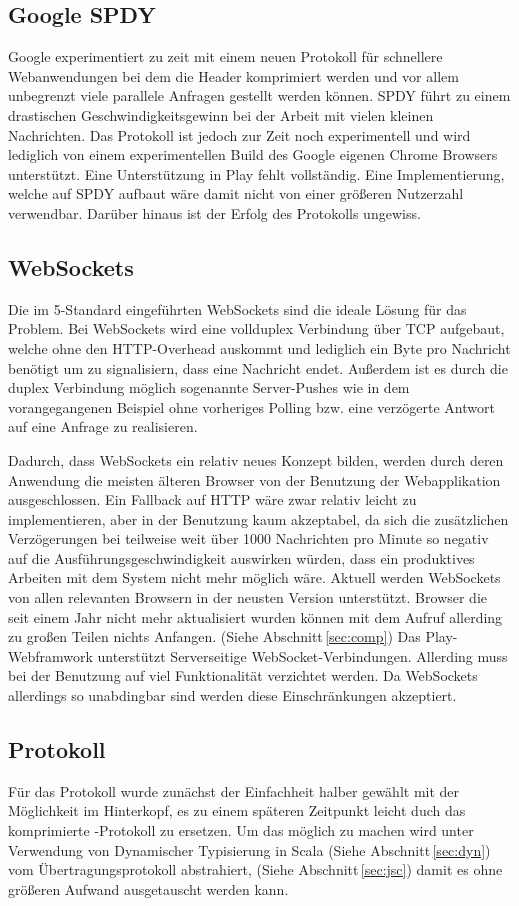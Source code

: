 \subsection{Google SPDY}

Google experimentiert zu zeit mit einem neuen Protokoll für schnellere Webanwendungen bei dem die
Header komprimiert werden und vor allem unbegrenzt viele parallele Anfragen gestellt werden können.
SPDY führt zu einem drastischen Geschwindigkeitsgewinn bei der Arbeit mit vielen kleinen
Nachrichten. Das Protokoll ist jedoch zur Zeit noch experimentell und wird lediglich von einem
experimentellen Build des Google eigenen Chrome Browsers unterstützt. Eine Unterstützung in Play
fehlt vollständig. Eine Implementierung, welche auf SPDY aufbaut wäre damit nicht von einer größeren
Nutzerzahl verwendbar. Darüber hinaus ist der Erfolg des Protokolls ungewiss.

\subsection{WebSockets}
\label{sec:ws}

Die im 5-Standard eingeführten WebSockets sind die ideale Lösung für das Problem. Bei
WebSockets wird eine vollduplex Verbindung über TCP aufgebaut, welche ohne den HTTP-Overhead
auskommt und lediglich ein Byte pro Nachricht benötigt um zu signalisiern, dass eine Nachricht
endet. Außerdem ist es durch die duplex Verbindung möglich sogenannte Server-Pushes wie in dem
vorangegangenen Beispiel ohne vorheriges Polling bzw. eine verzögerte Antwort auf eine Anfrage zu
realisieren.

Dadurch, dass WebSockets ein relativ neues Konzept bilden, werden durch deren Anwendung die meisten
älteren Browser von der Benutzung der Webapplikation ausgeschlossen. Ein Fallback auf HTTP wäre zwar
relativ leicht zu implementieren, aber in der Benutzung kaum akzeptabel, da sich die zusätzlichen
Verzögerungen bei teilweise weit über 1000 Nachrichten pro Minute so negativ auf die
Ausführungsgeschwindigkeit auswirken würden, dass ein produktives Arbeiten mit dem System nicht mehr
möglich wäre. Aktuell werden WebSockets von allen relevanten Browsern in der neusten Version
unterstützt. Browser die seit einem Jahr nicht mehr aktualisiert wurden können mit dem Aufruf
allerding zu großen Teilen nichts Anfangen. (Siehe Abschnitt\,\ref{sec:comp}) Das Play-Webframwork
unterstützt Serverseitige WebSocket-Verbindungen. Allerding muss bei der Benutzung auf viel
Funktionalität verzichtet werden. Da WebSockets allerdings so unabdingbar sind werden diese
Einschränkungen akzeptiert.

\subsection{Protokoll}

Für das Protokoll wurde zunächst der Einfachheit halber  gewählt mit der Möglichkeit im
Hinterkopf, es zu einem späteren Zeitpunkt leicht duch das komprimierte -Protokoll zu
ersetzen. Um das möglich zu machen wird unter Verwendung von Dynamischer Typisierung in Scala (Siehe
Abschnitt\,\ref{sec:dyn}) vom Übertragungsprotokoll abstrahiert, (Siehe Abschnitt\,\ref{sec:jsc})
damit es ohne größeren Aufwand ausgetauscht werden kann.
